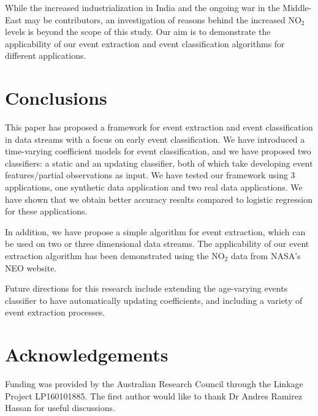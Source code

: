 \documentclass[a4paper,11pt]{article}
\begin{document}
While the increased industrialization in India and the ongoing war in the Middle-East  may be contributors, an investigation of reasons behind the increased $\text{NO}_2$ levels is beyond the scope of this study. Our aim is to demonstrate the applicability of our event extraction and event classification algorithms for different applications.

\section{Conclusions}\label{sec:Conclusions}

This paper has proposed a framework for event extraction and event classification in data streams with a focus on early event classification. We have introduced a time-varying coefficient models for event classification, and we have proposed two classifiers: a static and an updating classifier, both of which take developing event features/partial observations as input. We have tested our framework using 3 applications, one synthetic data application and two real data applications. We have shown that we obtain better accuracy results compared to logistic regression for these applications.

In addition, we have propose a simple algorithm for event extraction, which can be used on two or three dimensional data streams. The applicability of our event extraction algorithm has been demonstrated using the $\text{NO}_2$ data from NASA's NEO website.

Future directions for this research include extending the age-varying events classifier to have automatically updating coefficients, and including a variety of event extraction processes.

\section*{Acknowledgements}

Funding was provided by the Australian Research Council through the Linkage Project LP160101885. The first author would like to thank Dr Andres Ramirez Hassan for useful discussions.

\footnotesize


\end{document}
